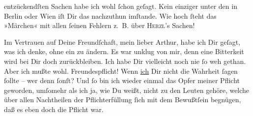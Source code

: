                entzückendſten Sachen habe ich \strikeout{\textcolor{gray}{×}} wohl{ }ſchon geſagt. Kein einziger unter den \label{K_L02674-8v}\label{K_L02674-8} in Berlin oder Wien iſt Dir das {\pb}nachzuthun imſtande. Wie hoch{ }ſteht das »Märchen« mit allen{ }ſeinen Fehlern z. B. über \textsc{Herzl}’s Sachen! {\dotsfour}\pend
           
\pstart
           Im Vertrauen auf Deine Freundſchaft, mein lieber Arthur, habe ich Dir geſagt, was ich
               denke, ohne ein \label{K_L02674-9v}\label{K_L02674-9} zu ändern. Es war unklug von mir, denn eine
               Bitterkeit wird bei Dir doch zurückbleiben. Ich habe Dir vielleicht noch nie{ }ſo weh
               gethan. Aber ich mußte wohl. Freundespflicht! Wenn \uline{ich} Dir nicht die Wahrheit{ }ſagen{ }ſollte – wer  denn{ }ſonſt? Und{ }ſo bin ich wieder einmal das Opfer meiner Pflicht geworden,
               umſomehr als ich ja, wie Du weißt, nicht zu den Leuten gehöre, welche über allen
               Nachtheilen der Pflichterfüllung{ }ſich mit dem Bewußtſein begnügen, daß es eben doch
               die Pflicht war.\pend
           
